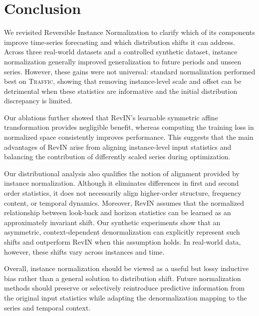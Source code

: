 \section{Conclusion} \label{conclu}

We revisited Reversible Instance Normalization to clarify which of its components improve time-series forecasting and which distribution shifts it can address. Across three real-world datasets and a controlled synthetic dataset, instance normalization generally improved generalization to future periods and unseen series. However, these gains were not universal: standard normalization performed best on \textsc{Traffic}, showing that removing instance-level scale and offset can be detrimental when these statistics are informative and the initial distribution discrepancy is limited.

Our ablations further showed that RevIN's learnable symmetric affine transformation provides negligible benefit, whereas computing the training loss in normalized space consistently improves performance. This suggests that the main advantages of RevIN arise from aligning instance-level input statistics and balancing the contribution of differently scaled series during optimization.

Our distributional analysis also qualifies the notion of alignment provided by instance normalization. Although it eliminates differences in first and second order statistics, it does not necessarily align higher-order structure, frequency content, or temporal dynamics. Moreover, RevIN assumes that the normalized relationship between look-back and horizon statistics can be learned as an approximately invariant shift. Our synthetic experiments show that an asymmetric, context-dependent denormalization can explicitly represent such shifts and outperform RevIN when this assumption holds. In real-world data, however, these shifts vary across instances and time.

Overall, instance normalization should be viewed as a useful but lossy inductive bias rather than a general solution to distribution shift. Future normalization methods should preserve or selectively reintroduce predictive information from the original input statistics while adapting the denormalization mapping to the series and temporal context.


